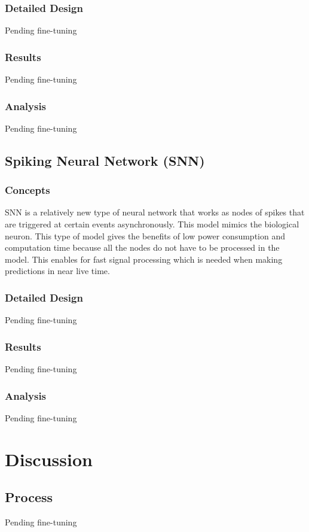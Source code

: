 \documentclass[12pt,titlepage]{article}
\begin{document}
\subsubsection{Detailed Design}
Pending fine-tuning

\subsubsection{Results}
Pending fine-tuning

\subsubsection{Analysis}
Pending fine-tuning

\subsection{Spiking Neural Network (SNN)}
\subsubsection{Concepts}
SNN is a relatively new type of neural network that works as nodes of spikes that are triggered at certain events asynchronously. This model
mimics the biological neuron. This type of model gives the benefits of low power consumption and computation time because all the nodes do
not have to be processed in the model. This enables for fast signal processing which is needed when making predictions in near live time.

\subsubsection{Detailed Design}
Pending fine-tuning

\subsubsection{Results}
Pending fine-tuning

\subsubsection{Analysis}
Pending fine-tuning

\section{Discussion}
\subsection{Process}
Pending fine-tuning
\end{document}
